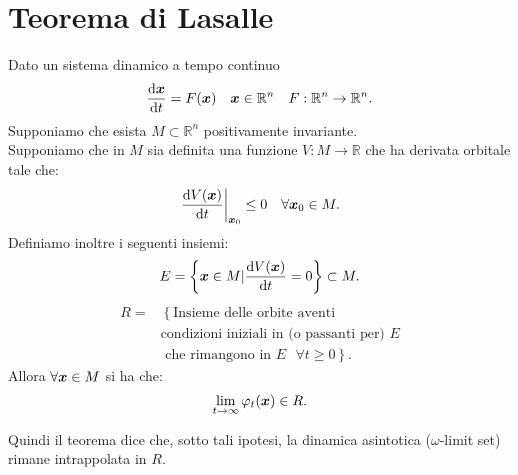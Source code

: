 \section{Teorema di Lasalle}%
\label{sub:Teorema di Lasalle}

\begin{thm}
    Dato un sistema dinamico a tempo continuo
    \[
	\frac{\text{d} \boldsymbol{x}}{\text{d} t} = F(\boldsymbol{x}) \quad  \boldsymbol{x}\in \mathbb{R}^n \quad  F:\mathbb{R}^n\to \mathbb{R}^n
    .\] 
    Supponiamo che esista $M\subset \mathbb{R}^n$ positivamente invariante.\\
    Supponiamo che in $M$ sia definita una funzione $V:M\to \mathbb{R}$  che ha derivata orbitale tale che:
    \[
	\left.\frac{\text{d} V(\boldsymbol{x}) }{\text{d} t}\right|_{\boldsymbol{x}_0} \le 0 \quad  \forall \boldsymbol{x}_0\in M
    .\] 
    Definiamo inoltre i seguenti insiemi:
    \[
	E = \left\{\boldsymbol{x}\in M| \frac{\text{d} V(\boldsymbol{x}) }{\text{d} t} = 0\right\} \subset M
    .\] 
    \[\begin{aligned}
	R = &\left\{\text{Insieme delle orbite aventi }\right.\\
	    &\left.\text{condizioni iniziali in (o passanti per) } E \right.\\
	    &\left.\text{ che rimangono in } E \text{ } \forall t \ge  0\right\}
    .\end{aligned}\]
    Allora $\forall \boldsymbol{x}\in M$ si ha che:
    \[
	\lim_{t \to \infty} \varphi_t(\boldsymbol{x}) \in R
    .\] 
\end{thm}
\noindent
Quindi il teorema dice che, sotto tali ipotesi, la dinamica asintotica ($\omega$-limit set) rimane intrappolata in $R$.
